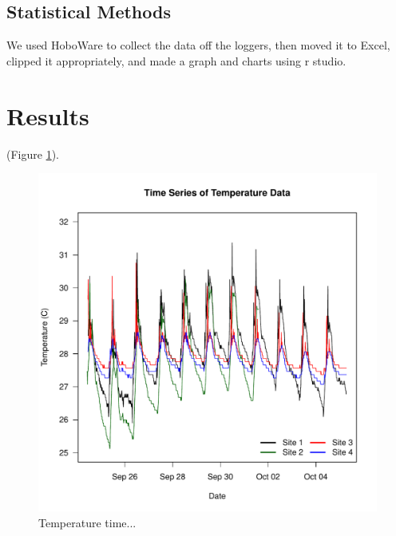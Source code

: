 \documentclass{article}
\begin{document}
\subsection{Statistical Methods}
We used HoboWare to collect the data off the loggers, then moved it to Excel, clipped it appropriately, and made a graph and charts using r studio. 

\section{Results}

(Figure \ref{Temp}).

\begin{figure}
\includegraphics{Figures/Temp}
\caption{Temperature time...}
\label{Temp}
\end{figure}
\end{document}
